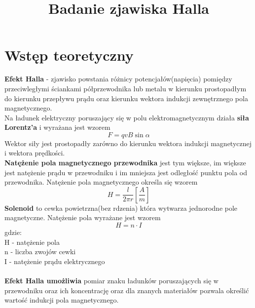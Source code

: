 \documentclass{article}
\begin{document}
\title{\huge\bfseries Badanie zjawiska Halla}
\date{}
\author{}
\maketitle
\section{Wstęp teoretyczny}
\textbf{Efekt Halla} - zjawisko powstania różnicy potencjałów(napięcia) pomiędzy przeciwległymi ściankami półprzewodnika lub metalu w kierunku prostopadłym do kierunku przepływu prądu oraz kierunku wektora indukcji zewnętrznego pola magnetycznego. \\
Na ładunek elektryczny poruszający się w polu elektromagnetycznym działa \textbf{siła Lorentz'a} i wyrażana jest wzorem
$$F = qvB\sin \alpha $$
Wektor siły jest prostopadły zarówno do kierunku wektora indukcji magnetycznej i wektora prędkości.\\
\textbf{Natężenie pola magnetycznego przewodnika} jest tym większe, im większe jest natężenie prądu w przewodniku i im mniejsza jest odległość punktu pola od przewodnika. Natężenie pola magnetycznego określa się wzorem
$$H = \frac{l}{2\pi r} [\frac{A}{m}]$$
\textbf{Solenoid} to cewka powietrzna(bez rdzenia) która wytwarza jednorodne pole magnetyczne. Natężenie pola wyrażane jest wzorem
$$H = n \cdot I $$
gdzie:\\
H - natężenie pola\\
n - liczba zwojów cewki\\
I - natężenie prądu elektrycznego\\\\
\textbf{Efekt Halla umożliwia} pomiar znaku ładunków poruszających się w przewodniku oraz ich koncentrację oraz
dla znanych materiałów pozwala określić wartość indukcji pola magnetycznego.
\end{document}
